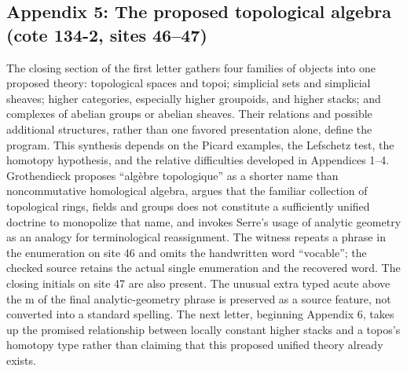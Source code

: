 \subsection*{Appendix 5: The proposed topological algebra (cote 134-2, sites 46--47)}
The closing section of the first letter gathers four families of objects into one proposed theory: topological spaces and topoi; simplicial sets and simplicial sheaves; higher categories, especially higher groupoids, and higher stacks; and complexes of abelian groups or abelian sheaves. Their relations and possible additional structures, rather than one favored presentation alone, define the program. This synthesis depends on the Picard examples, the Lefschetz test, the homotopy hypothesis, and the relative difficulties developed in Appendices 1--4. Grothendieck proposes ``algèbre topologique'' as a shorter name than noncommutative homological algebra, argues that the familiar collection of topological rings, fields and groups does not constitute a sufficiently unified doctrine to monopolize that name, and invokes Serre's usage of analytic geometry as an analogy for terminological reassignment. The witness repeats a phrase in the enumeration on site 46 and omits the handwritten word ``vocable''; the checked source retains the actual single enumeration and the recovered word. The closing initials on site 47 are also present. The unusual extra typed acute above the m of the final analytic-geometry phrase is preserved as a source feature, not converted into a standard spelling. The next letter, beginning Appendix 6, takes up the promised relationship between locally constant higher stacks and a topos's homotopy type rather than claiming that this proposed unified theory already exists.

